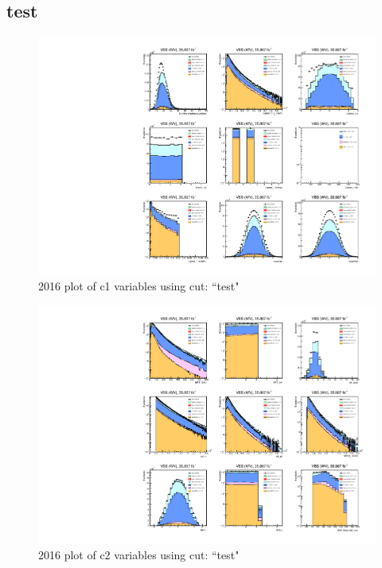 \documentclass{article}
\begin{document}
      \subsection*{test}
            \begin{figure}[H]
                \centering
                \caption{2016 plot of c1 variables using cut: ``test"}
                \includegraphics[width=\textwidth]{2016/c1_2016_test.pdf}
            \end{figure}
            \begin{figure}[H]
                \centering
                \caption{2016 plot of c2 variables using cut: ``test"}
                \includegraphics[width=\textwidth]{2016/c2_2016_test.pdf}
            \end{figure}
\end{document}
